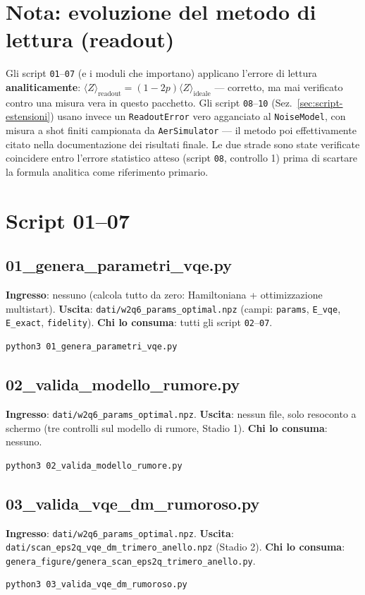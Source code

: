 \documentclass[11pt,a4paper]{article}
\begin{document}
\section{Nota: evoluzione del metodo di lettura (readout)}
\label{sec:nota-readout}

Gli script \texttt{01}--\texttt{07} (e i moduli che importano) applicano
l'errore di lettura \textbf{analiticamente}:
$\langle Z\rangle_\text{readout}=(1-2p)\langle Z\rangle_\text{ideale}$ ---
corretto, ma mai verificato contro una misura vera in questo pacchetto.
Gli script \texttt{08}--\texttt{10} (Sez.~\ref{sec:script-estensioni})
usano invece un \texttt{ReadoutError} vero agganciato al
\texttt{NoiseModel}, con misura a shot finiti campionata da
\texttt{AerSimulator} --- il metodo poi effettivamente citato nella
documentazione dei risultati finale. Le due strade sono state verificate
coincidere entro l'errore statistico atteso (script \texttt{08},
controllo 1) prima di scartare la formula analitica come riferimento
primario.

\section{Script 01--07}

\subsection{01\_genera\_parametri\_vqe.py}
\textbf{Ingresso}: nessuno (calcola tutto da zero: Hamiltoniana +
ottimizzazione multistart). \textbf{Uscita}:
\texttt{dati/w2q6\_params\_optimal.npz} (campi: \texttt{params},
\texttt{E\_vqe}, \texttt{E\_exact}, \texttt{fidelity}). \textbf{Chi lo
consuma}: tutti gli script \texttt{02}--\texttt{07}.
\begin{verbatim}
python3 01_genera_parametri_vqe.py
\end{verbatim}

\subsection{02\_valida\_modello\_rumore.py}
\textbf{Ingresso}: \texttt{dati/w2q6\_params\_optimal.npz}.
\textbf{Uscita}: nessun file, solo resoconto a schermo (tre controlli
sul modello di rumore, Stadio 1). \textbf{Chi lo consuma}: nessuno.
\begin{verbatim}
python3 02_valida_modello_rumore.py
\end{verbatim}

\subsection{03\_valida\_vqe\_dm\_rumoroso.py}
\textbf{Ingresso}: \texttt{dati/w2q6\_params\_optimal.npz}.
\textbf{Uscita}: \texttt{dati/scan\_eps2q\_\allowbreak vqe\_dm\_trimero\_anello.npz}
(Stadio 2). \textbf{Chi lo consuma}:
\texttt{genera\_figure/\allowbreak genera\_scan\_eps2q\_\allowbreak trimero\_anello.py}.
\begin{verbatim}
python3 03_valida_vqe_dm_rumoroso.py
\end{verbatim}
\end{document}
